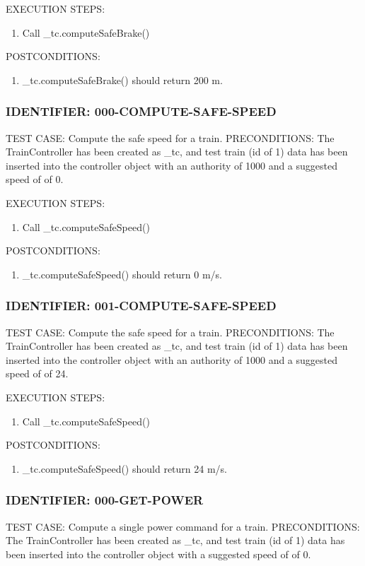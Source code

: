 \documentclass{scrreprt}
\begin{document}
EXECUTION STEPS:
\begin{enumerate}
	\item Call _tc.computeSafeBrake()
\end{enumerate}
POSTCONDITIONS:
\begin{enumerate}
	\item _tc.computeSafeBrake() should return 200 m.
\end{enumerate}

\subsubsection{IDENTIFIER: 000-COMPUTE-SAFE-SPEED}
TEST CASE: Compute the safe speed for a train.
PRECONDITIONS: The TrainController has been created as _tc, and test train (id of 1) data has been inserted into the controller object with an authority of 1000 and a suggested speed of of 0.

EXECUTION STEPS:
\begin{enumerate}
	\item Call _tc.computeSafeSpeed()
\end{enumerate}
POSTCONDITIONS:
\begin{enumerate}
	\item _tc.computeSafeSpeed() should return 0 m/s.
\end{enumerate}

\subsubsection{IDENTIFIER: 001-COMPUTE-SAFE-SPEED}
TEST CASE: Compute the safe speed for a train.
PRECONDITIONS: The TrainController has been created as _tc, and test train (id of 1) data has been inserted into the controller object with an authority of 1000 and a suggested speed of of 24.

EXECUTION STEPS:
\begin{enumerate}
	\item Call _tc.computeSafeSpeed()
\end{enumerate}
POSTCONDITIONS:
\begin{enumerate}
	\item _tc.computeSafeSpeed() should return 24 m/s.
\end{enumerate}

\subsubsection{IDENTIFIER: 000-GET-POWER}
TEST CASE: Compute a single power command for a train.
PRECONDITIONS: The TrainController has been created as _tc, and test train (id of 1) data has been inserted into the controller object with a suggested speed of of 0.
\end{document}
